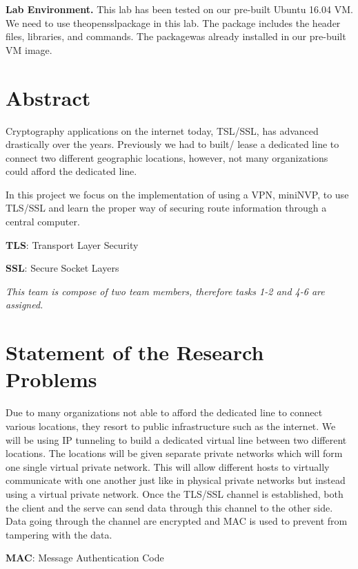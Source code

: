 \documentclass[12pt]{article}
\begin{document}
\textbf{Lab  Environment.} This  lab  has  been  tested  on  our  pre-built  Ubuntu  16.04  VM.  We  need  to  use  theopensslpackage in this lab. The package includes the header files, libraries, and commands. The packagewas already installed in our pre-built VM image.

\clearpage


\section{Abstract}
Cryptography applications on the internet today, TSL/SSL, has advanced drastically over the years. Previously we  had to built/ lease a dedicated line to connect  two different geographic locations, however, not many organizations could afford the dedicated line. 

In this project we focus on the implementation of using a VPN, miniNVP, to use TLS/SSL and learn the proper way of securing route information through a central computer. 

 \item \textbf{TLS}: Transport Layer Security
 \item \textbf{SSL}: Secure Socket Layers
 
 \item \textit{This team is compose of two team members, therefore tasks 1-2 and 4-6 are assigned. }



\section{Statement of the Research Problems}
Due to many organizations not able to afford the dedicated line to connect various locations, they resort to public infrastructure such as the internet. We will be using IP tunneling to build a dedicated virtual line between two different locations. The locations will be given separate private networks which will form one single virtual private network. This will allow different hosts to virtually communicate with one another just like in physical private networks but instead using a virtual private network. Once the TLS/SSL channel is established, both the client and the serve can send data through this channel to the other side. Data going through the channel are encrypted and MAC is used to prevent from tampering with the data. 

\item \textbf{MAC}: Message Authentication Code
\end{document}
